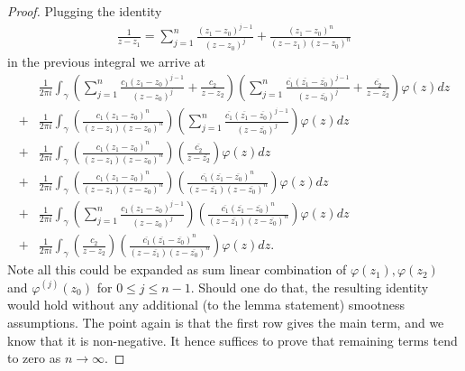 \begin{proof}
	Plugging the identity
	\begin{align*}
	\frac{1}{z - z_{1}} = \sum_{j = 1}^{n} \frac{(z_{1} - z_{0})^{j - 1}}{(z - z_{0})^{j}} + \frac{(z_{1} - z_{0})^{n}}{(z - z_{1})(z - z_{0})^{n}}
	\end{align*}
	in the previous integral we arrive at
	\begin{align*}
		&\frac{1}{2 \pi i}\int_{\gamma} \left(\sum_{j = 1}^{n} \frac{c_{1}(z_{1} - z_{0})^{j - 1}}{(z - z_{0})^{j}}  + \frac{c_{2}}{z - z_{2}} \right)  \left(\sum_{j = 1}^{n} \frac{\overline{c_{1}} (\overline{z_{1}} - \overline{z_{0}})^{j - 1}}{(z - \overline{z_{0}})^{j}} + \frac{\overline{c_{2}}}{z - \overline{z_{2}}} \right) \varphi(z) dz\\
		+&\frac{1}{2 \pi i}\int_{\gamma} \left(\frac{c_{1}(z_{1} - z_{0})^{n}}{(z - z_{1})(z - z_{0})^{n}}\right) \left(\sum_{j = 1}^{n} \frac{\overline{c_{1}} (\overline{z_{1}} - \overline{z_{0}})^{j - 1}}{(z - \overline{z_{0}})^{j}}\right) \varphi(z) dz\\
		+&\frac{1}{2 \pi i}\int_{\gamma} \left(\frac{c_{1}(z_{1} - z_{0})^{n}}{(z - z_{1})(z - z_{0})^{n}}\right) \left(\frac{\overline{c_{2}}}{z - \overline{z_{2}}} \right) \varphi(z) dz\\
		+&\frac{1}{2 \pi i}\int_{\gamma} \left(\frac{c_{1}(z_{1} - z_{0})^{n}}{(z - z_{1})(z - z_{0})^{n}}\right) \left(\frac{\overline{c_{1}}(\overline{z_{1}} - \overline{z_{0}})^{n}}{(z - \overline{z_{1}})(z - \overline{z_{0}})^{n}}\right) \varphi(z) dz \\
		+& \frac{1}{2 \pi i}\int_{\gamma} \left(\sum_{j = 1}^{n} \frac{c_{1}(z_{1} - z_{0})^{j - 1}}{(z - z_{0})^{j}}\right) \left(\frac{\overline{c_{1}}(\overline{z_{1}} - \overline{z_{0}})^{n}}{(z - \overline{z_{1}})(z - \overline{z_{0}})^{n}}\right) \varphi(z) dz \\
		+& \frac{1}{2 \pi i}\int_{\gamma} \left(\frac{c_{2}}{z - z_{2}}\right) \left(\frac{\overline{c_{1}}(\overline{z_{1}} - \overline{z_{0}})^{n}}{(z - \overline{z_{1}})(z - \overline{z_{0}})^{n}}\right) \varphi(z) dz.
	\end{align*}
	Note all this could be expanded as sum linear combination of $\varphi(z_{1}), \varphi(z_{2})$ and $\varphi^{(j)}(z_{0})$ for $0 \leq j \leq n - 1$. Should one do that, the resulting identity would hold without any additional (to the lemma statement) smootness assumptions. The point again is that the first row gives the main term, and we know that it is non-negative. It hence suffices to prove that remaining terms tend to zero as $n \to \infty$.


\end{proof}
